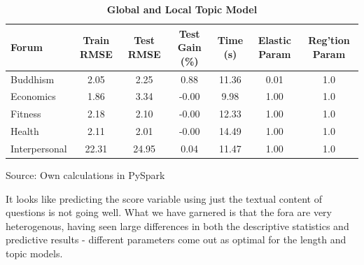 \documentclass[11pt,preprint, authoryear]{article}
\numberwithin{equation}{section}
\begin{document}
\begin{longtable}[htbp] {@{} lcccccc @{}} 
\caption{\textbf{Global and Local Topic Model}} 
\label{tab:rand_topic_model} \\
\toprule
\textbf{Forum} &  \textbf{Train RMSE} &  \textbf{Test RMSE} &  \textbf{Test Gain (\%)} &  \textbf{Time (s)} & \textbf{Elastic Param} &  \textbf{Reg'tion Param} \\
\midrule
Buddhism      &              2.05 &           2.25 &            0.88 &           11.36 &              0.01 &               1.0 \\
Economics     &              1.86 &           3.34 &           -0.00 &            9.98 &              1.00 &               1.0 \\
Fitness       &              2.18 &           2.10 &           -0.00 &           12.33 &              1.00 &               1.0 \\
Health        &              2.11 &           2.01 &           -0.00 &           14.49 &              1.00 &               1.0 \\
Interpersonal &             22.31 &          24.95 &            0.04 &           11.47 &              1.00 &               1.0 \\
\bottomrule
\end{longtable}\begin{center} Source: Own calculations in PySpark\end{center}

\normalsize

It looks like predicting the score variable using just the textual
content of questions is not going well. What we have garnered is that
the fora are very heterogenous, having seen large differences in both
the descriptive statistics and predictive results - different parameters
come out as optimal for the length and topic models.

\footnotesize
\end{document}
